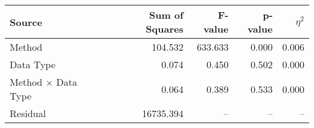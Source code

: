\begin{small}
\begin{ttfamily}
\begin{tabular}{lrrrr}
\toprule
Source & Sum of Squares & F-value & p-value & $\eta^2$ \\
\midrule
Method & 104.532 & 633.633 & 0.000 & 0.006 \\
Data Type & 0.074 & 0.450 & 0.502 & 0.000 \\
Method × Data Type & 0.064 & 0.389 & 0.533 & 0.000 \\
Residual & 16735.394 & -- & -- & -- \\
\bottomrule
\end{tabular}
\end{ttfamily}
\end{small}

